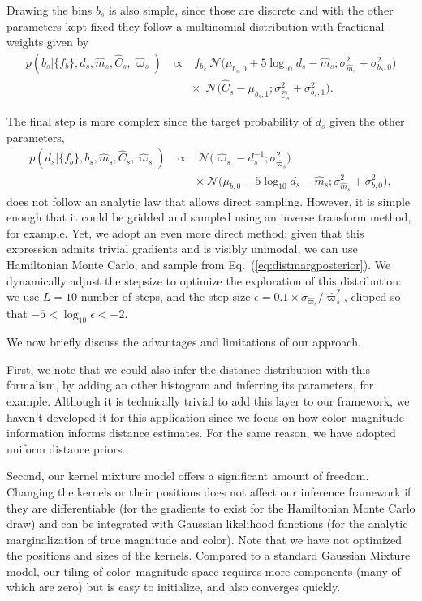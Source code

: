 \documentclass[manuscript, letterpaper]{aastex6}
\makeatletter
\let\origsubsection\subsection
\renewcommand\subsection{\@ifstar{\starsubsection}{\nostarsubsection}}
\newcommand\nostarsubsection[1]{\subsectionprelude\origsubsection{#1}}
\newcommand\starsubsection[1]{\subsectionprelude\origsubsection*{#1}}
\newcommand\subsectionprelude{\vspace{1em}}
\newcommand{\equref}[1]{{\xspace}Eq.~(\ref{#1})}
\newcommand{\eqn}[1]{\begin{eqnarray}#1\end{eqnarray}}
\makeatother
\begin{document}
Drawing the bins $b_s$ is also simple, since those are discrete and with the other parameters kept fixed they follow a multinomial distribution with fractional weights given by
\eqn{
	p\left(b_s \bigr\rvert \bigl\{ f_b \bigr\}, d_s, \hat{m}_s, \hat{C}_s, \hat{\varpi}_s\right) \ &\propto&  \ f_{b_s} \  \mathcal{N}\bigl( \mu_{b_s,0} + 5\log_{10}d_s  -\hat{m}_s ;\sigma_{\hat{m}_s}^2 + \sigma_{b_s,0}^2 \bigr) \\ && \times \  \ \mathcal{N}\bigl(\hat{C}_s - \mu_{b_s,1};\sigma_{\hat{C}_s}^2 + \sigma_{b_s,1}^2 \bigr).\nonumber
}

The final step is more complex since the target probability of $d_s$ given the other parameters,
\eqn{
	p\left(d_s \bigr\rvert \bigl\{ f_b \bigr\}, b_s, \hat{m}_s, \hat{C}_s, \hat{\varpi}_s\right) \ &\propto& \  \mathcal{N}\bigl(\hat{\varpi}_s - d_s^{-1};\sigma_{\hat{\varpi}_s}^2 \bigr) \\ && \times \  \mathcal{N}\bigl( \mu_{b,0} + 5\log_{10}d_s  -\hat{m}_s ;\sigma_{\hat{m}_s}^2 + \sigma_{b,0}^2 \bigr) ,\label{eq:distmargposterior}\nonumber
}
does not follow an analytic law that allows direct sampling.
However, it is simple enough that it could be gridded and sampled using an inverse transform method, for example.
Yet, we adopt an even more direct method: given that this expression admits trivial gradients and is visibly unimodal, we can use Hamiltonian Monte Carlo, and sample from \equref{eq:distmargposterior}. 
We dynamically adjust the stepsize to optimize the exploration of this distribution: we use $L=10$ number of steps, and the step size $\epsilon = 0.1 \times \sigma_{\hat{\varpi}_s} / \hat{\varpi}_s^2$, clipped so that $-5 < \log_{10} \epsilon < -2$.


\subsection{Discussion}

We now briefly discuss the advantages and limitations of our approach.

First, we note that we could also infer the distance distribution with this formalism, by adding an other histogram and inferring its parameters, for example. 
Although it is technically trivial to add this layer to our framework, we haven't developed it for this application since we focus on how color--magnitude information informs distance estimates.
For the same reason, we have adopted uniform distance priors.

Second, our kernel mixture model offers a significant amount of freedom.
Changing the kernels or their positions does not affect our inference framework if they are differentiable (for the gradients to exist for the Hamiltonian Monte Carlo draw) and can be integrated with Gaussian likelihood functions (for the analytic marginalization of true magnitude and color).
Note that we have not optimized the positions and sizes of the kernels. 
Compared to a standard Gaussian Mixture model, our tiling of color--magnitude space requires more components (many of which are zero) but is easy to initialize, and also converges quickly. 
\end{document}
